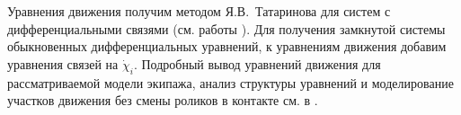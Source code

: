 Уравнения движения получим методом Я.В.~Татаринова для систем с дифференциальными связями (см. работы \cite{Tatarinov,Zobova2011}). Для получения замкнутой системы обыкновенных дифференциальных уравнений, к уравнениям движения добавим уравнения связей на $\dot{\chi}_i$. Подробный вывод уравнений движения для рассматриваемой модели экипажа, анализ структуры уравнений и моделирование участков движения без смены роликов в контакте см. в \cite{ZobovaGerasimovPMM}.



